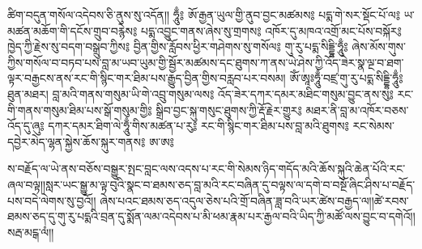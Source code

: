 {ཚིག་བདུན་གསོལ་འདེབས་ཅི་ནུས་སུ་འདོན།།}
{
  \Large
  ཧཱུྃ༔ ཨོ་རྒྱན་ཡུལ་གྱི་ནུབ་བྱང་མཚམས༔
  པདྨ་གེ་སར་སྡོང་པོ་ལ༔
  ཡ་མཚན་མཆོག་གི་དངོས་གྲུབ་བརྙེས༔
  པདྨ་འབྱུང་གནས་ཞེས་སུ་གྲགས༔
  འཁོར་དུ་མཁའ་འགྲོ་མང་པོས་བསྐོར༔
  ཁྱེད་ཀྱི་རྗེས་སུ་བདག་བསྒྲུབ་ཀྱིས༔
  བྱིན་གྱིས་རློབས་ཕྱིར་གཤེགས་སུ་གསོལ༔
  གུ་རུ་པདྨ་སིདྡྷི་ཧཱུྃ༔
}
{ཞེས་མོས་གུས་ཀྱིས་གསོལ་བ་བཏབ་པས་བླ་མ་ཡབ་ཡུམ་གྱི་སྦྱོར་མཚམས་དང་ཐུགས་ཀ་ནས་ཡེ་ཤེས་ཀྱི་འོད་ཟེར་སྣ་ལྔ་བ་ཐག་ལྟར་བརྒྱངས་ནས་རང་གི་སྙིང་གར་ཐིམ་པས་རྒྱུད་བྱིན་གྱིས་བརླབ་པར་བསམ།}
{
  \Large
  ཨོཾ་ཨཱཿཧཱུྃ་བཛྲ་གུ་རུ་པདྨ་སིདྡྷི་ཧཱུྃ༔
}
{ཐུན་མཐར།}
{
  \Large
  བླ་མའི་གནས་གསུམ་ཡི་གེ་འབྲུ་གསུམ་ལས༔
  འོད་ཟེར་དཀར་དམར་མཐིང་གསུམ་བྱུང་ནས་སུ༔
  རང་གི་གནས་གསུམ་ཐིམ་པས་སྒོ་གསུམ་གྱི༔
  སྒྲིབ་བྱང་སྐུ་གསུང་ཐུགས་ཀྱི་རྡོ་རྗེར་གྱུར༔
  མཐར་ནི་བླ་མ་འཁོར་བཅས་འོད་དུ་ཞུ༔
  དཀར་དམར་ཐིག་ལེ་ཧཱུྃ་གིས་མཚན་པ་རུ༔
  རང་གི་སྙིང་གར་ཐིམ་པས་བླ་མའི་ཐུགས༔
  རང་སེམས་དབྱེར་མེད་ལྷན་སྐྱེས་ཆོས་སྐུར་གནས༔
  ཨ་ཨ༔
}

ས་བརྗོད་ལ་ཡེ་ནས་བཅོས་བསྒྱུར་སྤང་བླང་ལས་འདས་པ་རང་གི་སེམས་ཉིད་གདོད་མའི་ཆོས་སྐུའི་ཆེན་པོའི་རང་ཞལ་བལྟ།།སླར་ཡང་སྒྱུ་མ་ལྟ་བུའི་སྣང་བ་ཐམས་ཅད་བླ་མའི་རང་བཞིན་དུ་བལྟས་ལ་དགེ་བ་བསྔོ་ཞིང་ཤིས་པ་བརྗོད་པས་བདེ་ལེགས་སུ་བྱའོ།།
ཞེས་པའང་ཐམས་ཅད་འདུལ་ཅེས་པའི་གྲོ་བཞིན་ཟླ་བའི་ཡར་ཚེས་བརྒྱད་ལ།།ཚེ་རབས་ཐམས་ཅད་དུ་གུ་རུ་པདྨའི་བྲན་དུ་སྨོན་ལམ་འདེབས་པ་མི་ཕམ་རྣམ་པར་རྒྱལ་བའི་ཡིད་ཀྱི་མཚོ་ལས་བྱུང་བ་དགེའོ།།
སརྦ་མངྒ་ལཾ།།

